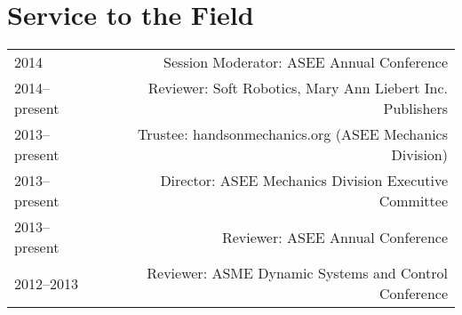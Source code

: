 \section*{Service to the Field}
\begin{tabular}{L!{\VRule}R}
2014&Session Moderator: ASEE Annual Conference\\
2014--present&Reviewer: Soft Robotics, Mary Ann Liebert Inc. Publishers\\
2013--present&Trustee: handsonmechanics.org (ASEE Mechanics Division)\\
2013--present&Director: ASEE Mechanics Division Executive Committee\\
2013--present&Reviewer: ASEE Annual Conference\\
2012--2013&Reviewer: ASME Dynamic Systems and Control Conference\\
\end{tabular}